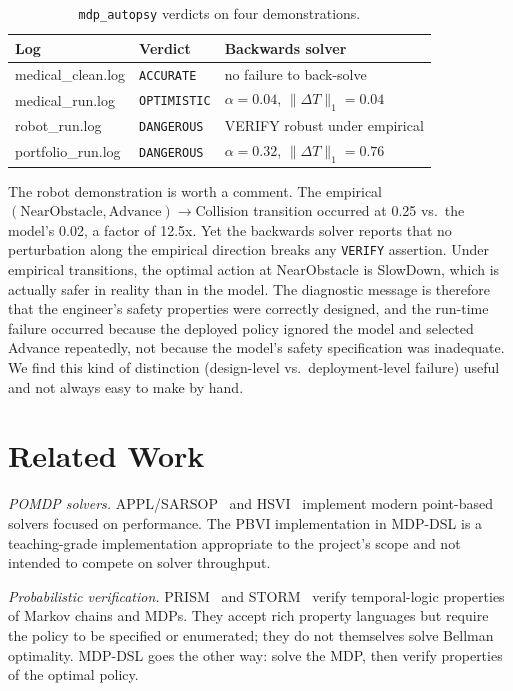 \documentclass[conference]{IEEEtran}
\begin{document}
\begin{table}[h]
\caption{\texttt{mdp\_autopsy} verdicts on four demonstrations.}
\label{tab:autopsy}
\centering
\begin{tabular}{lll}
\hline
\textbf{Log} & \textbf{Verdict} & \textbf{Backwards solver} \\
\hline
medical\_clean.log  & \texttt{ACCURATE}   & no failure to back-solve \\
medical\_run.log    & \texttt{OPTIMISTIC} & $\alpha{=}0.04$, $\|\Delta T\|_1{=}0.04$ \\
robot\_run.log      & \texttt{DANGEROUS}  & VERIFY robust under empirical \\
portfolio\_run.log  & \texttt{DANGEROUS}  & $\alpha{=}0.32$, $\|\Delta T\|_1{=}0.76$ \\
\hline
\end{tabular}
\end{table}

The robot demonstration is worth a comment. The empirical
$(\text{NearObstacle}, \text{Advance}) \to \text{Collision}$
transition occurred at 0.25 vs.\ the model's 0.02, a factor of
12.5x. Yet the backwards solver reports that no perturbation along
the empirical direction breaks any \texttt{VERIFY} assertion. Under
empirical transitions, the optimal action at NearObstacle is
SlowDown, which is actually safer in reality than in the model. The
diagnostic message is therefore that the engineer's safety
properties were correctly designed, and the run-time failure
occurred because the deployed policy ignored the model and selected
Advance repeatedly, not because the model's safety specification
was inadequate. We find this kind of distinction (design-level
vs.\ deployment-level failure) useful and not always easy to make
by hand.

\section{Related Work}

\emph{POMDP solvers.} APPL/SARSOP~\cite{kurniawati2008sarsop} and
HSVI~\cite{smith2004heuristic} implement modern point-based solvers
focused on performance. The PBVI implementation in MDP-DSL is a
teaching-grade implementation appropriate to the project's scope and
not intended to compete on solver throughput.

\emph{Probabilistic verification.} PRISM~\cite{kwiatkowska2011prism}
and STORM~\cite{dehnert2017storm} verify temporal-logic properties
of Markov chains and MDPs. They accept rich property languages but
require the policy to be specified or enumerated; they do not
themselves solve Bellman optimality. MDP-DSL goes the other way:
solve the MDP, then verify properties of the optimal policy.
\end{document}
